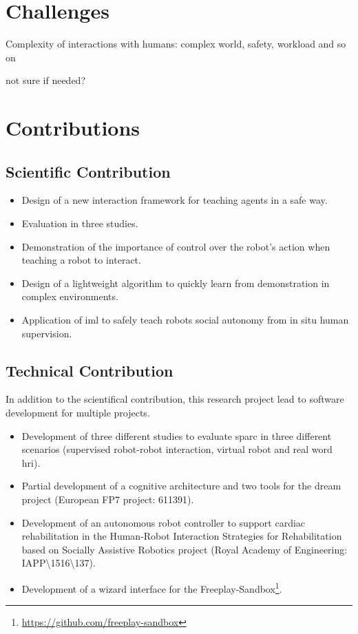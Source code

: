 \section{Challenges}

Complexity of interactions with humans: complex world, safety, workload and so on

not sure if needed?

\section{Contributions}\label{sec:intro-contr}

\subsection{Scientific Contribution}
\begin{itemize}
	\item Design of a new interaction framework for teaching agents in a safe way.
	\item Evaluation in three studies.
	\item Demonstration of the importance of control over the robot's action when teaching a robot to interact.
	\item Design of a lightweight algorithm to quickly learn from demonstration in complex environments.
	\item Application of \gls{iml} to safely teach robots social autonomy from in situ human supervision. 
\end{itemize}

\subsection{Technical Contribution}
In addition to the scientifical contribution, this research project lead to software development for multiple projects.
\begin{itemize}
	\item Development of three different studies to evaluate \gls{sparc} in three different scenarios (supervised robot-robot interaction, virtual robot and real word \gls{hri}).
	\item Partial development of a cognitive architecture and two tools for the \acrshort{dream} project (European FP7 project: 611391).
	\item Development of an autonomous robot controller to support cardiac rehabilitation in the Human-Robot Interaction Strategies for Rehabilitation based on Socially Assistive Robotics project (Royal Academy of Engineering: IAPP\textbackslash1516\textbackslash137).
	\item Development of a wizard interface for the Freeplay-Sandbox\footnote{\url{https://github.com/freeplay-sandbox}}. 
\end{itemize}
	
